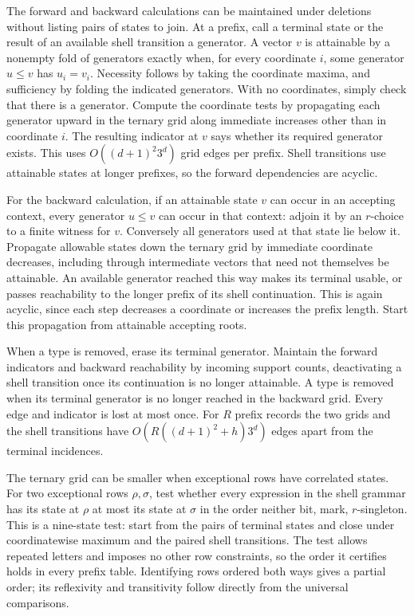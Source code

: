 The forward and backward calculations can be maintained
under deletions without listing pairs of states to join.
At a prefix, call a terminal state or the result of an
available shell transition a generator. A vector $v$
is attainable by a nonempty fold of generators exactly
when, for every coordinate $i$, some generator $u\le v$
has $u_i=v_i$. Necessity follows by taking the coordinate
maxima, and sufficiency by folding the indicated
generators. With no coordinates, simply check that
there is a generator. Compute the coordinate tests
by propagating each generator upward in the ternary
grid along immediate increases other than in coordinate
$i$. The resulting indicator at $v$ says whether its
required generator exists. This uses $O((d+1)^2 3^d)$
grid edges per prefix. Shell transitions use attainable
states at longer prefixes, so the forward dependencies
are acyclic.

For the backward calculation, if an attainable state
$v$ can occur in an accepting context, every generator
$u\le v$ can occur in that context: adjoin it by an
$r$-choice to a finite witness for $v$. Conversely all
generators used at that state lie below it. Propagate
allowable states down the ternary grid by immediate
coordinate decreases, including through intermediate
vectors that need not themselves be attainable. An
available generator reached this way makes its terminal
usable, or passes reachability to the longer prefix
of its shell continuation. This is again acyclic,
since each step decreases a coordinate or increases
the prefix length. Start this propagation from
attainable accepting roots.

When a type is removed, erase its terminal generator.
Maintain the forward indicators and backward
reachability by incoming support counts, deactivating
a shell transition once its continuation is no
longer attainable. A type is removed when its
terminal generator is no longer reached in the
backward grid. Every edge and indicator is lost
at most once. For $R$ prefix records the two grids
and the shell transitions have
$O(R((d+1)^2+h)3^d)$ edges apart from the terminal
incidences.

The ternary grid can be smaller when exceptional
rows have correlated states. For two exceptional
rows $\rho,\sigma$, test whether every expression
in the shell grammar has its state at $\rho$ at
most its state at $\sigma$ in the order neither
bit, mark, $r$-singleton. This is a nine-state
test: start from the pairs of terminal states and
close under coordinatewise maximum and the paired
shell transitions. The test allows repeated letters
and imposes no other row constraints, so the order
it certifies holds in every prefix table. Identifying
rows ordered both ways gives a partial order;
its reflexivity and transitivity follow directly
from the universal comparisons.

